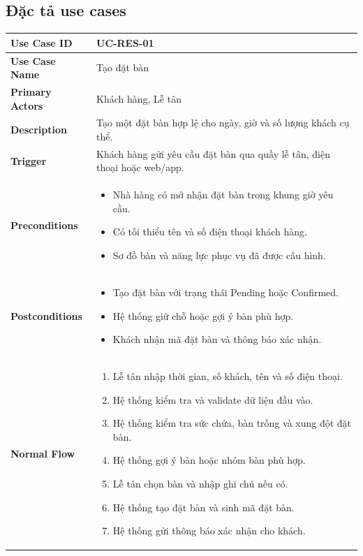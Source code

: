 \subsection{Đặc tả use cases}

\renewcommand{\arraystretch}{1.3}

\begin{longtable}{|p{4cm}|p{10cm}|}
\hline
\textbf{Use Case ID} & UC-RES-01 \\ \hline
\textbf{Use Case Name} & Tạo đặt bàn \\ \hline
\textbf{Primary Actors} & Khách hàng, Lễ tân \\ \hline

\textbf{Description} & Tạo một đặt bàn hợp lệ cho ngày, giờ và số lượng khách cụ thể. \\ \hline

\textbf{Trigger} & Khách hàng gửi yêu cầu đặt bàn qua quầy lễ tân, điện thoại hoặc web/app. \\ \hline

\textbf{Preconditions} &
\begin{itemize}[leftmargin=*, noitemsep]
  \item Nhà hàng có mở nhận đặt bàn trong khung giờ yêu cầu.
  \item Có tối thiểu tên và số điện thoại khách hàng.
  \item Sơ đồ bàn và năng lực phục vụ đã được cấu hình.
\end{itemize} \\ \hline

\textbf{Postconditions} &
\begin{itemize}[leftmargin=*, noitemsep]
  \item Tạo đặt bàn với trạng thái \textsf{Pending} hoặc \textsf{Confirmed}.
  \item Hệ thống giữ chỗ hoặc gợi ý bàn phù hợp.
  \item Khách nhận mã đặt bàn và thông báo xác nhận.
\end{itemize} \\ \hline

\textbf{Normal Flow} &
\begin{enumerate}[leftmargin=*, noitemsep]
  \item Lễ tân nhập thời gian, số khách, tên và số điện thoại.
  \item Hệ thống kiểm tra và validate dữ liệu đầu vào.
  \item Hệ thống kiểm tra sức chứa, bàn trống và xung đột đặt bàn.
  \item Hệ thống gợi ý bàn hoặc nhóm bàn phù hợp.
  \item Lễ tân chọn bàn và nhập ghi chú nếu có.
  \item Hệ thống tạo đặt bàn và sinh mã đặt bàn.
  \item Hệ thống gửi thông báo xác nhận cho khách.
\end{enumerate} \\ \hline


\end{longtable}
